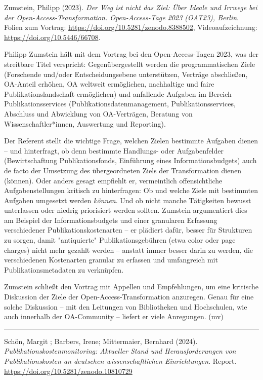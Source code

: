 \documentclass[a4paper,
fontsize=11pt,
oneside,
numbers=noperiodatend,
parskip=half-,
bibliography=totoc,
final
]{scrartcl}
\begin{document}
Zumstein, Philipp (2023). \emph{Der Weg ist nicht das Ziel: Über Ideale
und Irrwege bei der Open-Access-Transformation. Open-Access-Tage 2023
(OAT23), Berlin}. Folien zum Vortrag:
\url{https://doi.org/10.5281/zenodo.8388502}, Videoaufzeichnung:
\url{https://doi.org/10.5446/66708}.

Philipp Zumstein hält mit dem Vortrag bei den Open-Access-Tagen 2023,
was der streitbare Titel verspricht: Gegenübergestellt werden die
programmatischen Ziele (Forschende und/oder Entscheidungsebene
unterstützen, Verträge abschließen, OA-Anteil erhöhen, OA weltweit
ermöglichen, nachhaltige und faire Publikationslandschaft ermöglichen)
und anfallende Aufgaben im Bereich Publikationsservices
(Publikationsdatenmanagement, Publikationsservices, Abschluss und
Abwicklung von OA-Verträgen, Beratung von Wissenschaftler*innen,
Auswertung und Reporting).

Der Referent stellt die wichtige Frage, welchen Zielen bestimmte
Aufgaben dienen -- und hinterfragt, ob denn bestimmte Handlungs- oder
Aufgabenfelder (Bewirtschaftung Publikationsfonds, Einführung eines
Informationsbudgets) auch de facto der Umsetzung des übergeordneten
Ziels der Transformation dienen (können). Oder anders gesagt empfiehlt
er, vermeintlich offensichtliche Aufgabenstellungen kritisch zu
hinterfragen: Ob und welche Ziele mit bestimmten Aufgaben umgesetzt
werden \emph{können}. Und ob nicht manche Tätigkeiten bewusst
unterlassen oder niedrig priorisiert werden sollten. Zumstein
argumentiert dies am Beispiel der Informationsbudgets und einer
granularen Erfassung verschiedener Publikationskostenarten -- er
plädiert dafür, besser für Strukturen zu sorgen, damit "antiquierte"
Publikationsgebühren (etwa color oder page charges) nicht mehr gezahlt
werden -- anstatt immer besser darin zu werden, die verschiedenen
Kostenarten granular zu erfassen und umfangreich mit
Publikationsmetadaten zu verknüpfen.

Zumstein schließt den Vortrag mit Appellen und Empfehlungen, um eine
kritische Diskussion der Ziele der Open-Access-Transformation anzuregen.
Genau für eine solche Diskussion -- mit den Leitungen von Bibliotheken
und Hochschulen, wie auch innerhalb der OA-Community -- liefert er viele
Anregungen. (mv)

\begin{center}\rule{0.5\linewidth}{0.5pt}\end{center}

Schön, Margit ; Barbers, Irene; Mittermaier, Bernhard (2024).
\emph{Publikationskostenmonitoring: Aktueller Stand und
Herausforderungen von Publikationskosten an deutschen wissenschaftlichen
Einrichtungen}. Report. \url{https://doi.org/10.5281/zenodo.10810729}
\end{document}
